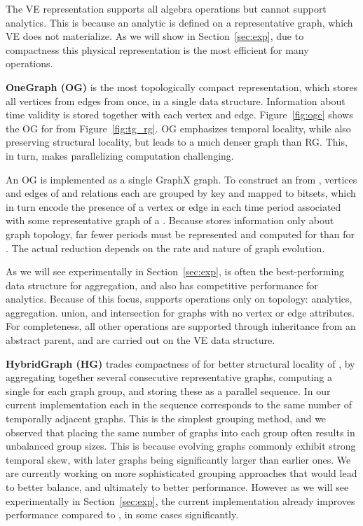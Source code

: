 
The VE representation supports all \tg algebra operations but cannot
support analytics.  This is because an analytic is defined on a
representative graph, which VE does not materialize.  As we will show
in Section~\ref{sec:exp}, due to compactness this physical
representation is the most efficient for many operations.

{\bf OneGraph (OG)} is the most topologically compact representation,
which stores all vertices from  edges from \tae once, in
a single data structure.  Information about time validity is stored
together with each vertex and edge.  Figure~\ref{fig:ogc} shows the OG
for  from Figure~\ref{fig:tg_rg}.  OG emphasizes temporal
locality, while also preserving structural locality, but leads to a
much denser graph than RG.  This, in turn, makes parallelizing
computation challenging.

An OG is implemented as a single GraphX graph.  To construct an \og
from \tve, vertices and edges of \tv and \te relations each are
grouped by key and mapped to bitsets, which in turn encode the
presence of a vertex or edge in each time period associated with some
representative graph of a \tg.  Because \og stores information only
about graph topology, far fewer periods must be represented and
computed for \og than for \rg.  The actual reduction depends on the
rate and nature of graph evolution.

As we will see experimentally in Section~\ref{sec:exp}, \og is often
the best-performing data structure for aggregation, and also has
competitive performance for analytics.  Because of this focus, \og
supports operations only on topology: analytics, aggregation. union,
and intersection for graphs with no vertex or edge attributes.  For
completeness, all other operations are supported through inheritance
from an abstract parent, and are carried out on the VE data structure.

{\bf HybridGraph (HG)} trades compactness of \og for better structural
locality of \rg, by aggregating together several consecutive
representative graphs, computing a single \og for each graph group,
and storing these as a parallel sequence.  In our current
implementation each \og in the sequence corresponds to the same number
of temporally adjacent graphs.
%
This is the simplest grouping method, and we observed that placing the
same number of graphs into each group often results in unbalanced
group sizes.  This is because evolving graphs commonly exhibit strong
temporal skew, with later graphs being significantly larger than earlier
ones.  We are currently working on more sophisticated grouping
approaches that would lead to better balance, and ultimately to better
performance.  However as we will see experimentally in
Section~\ref{sec:exp}, the current \hg implementation already improves
performance compared to \og, in some cases significantly.

